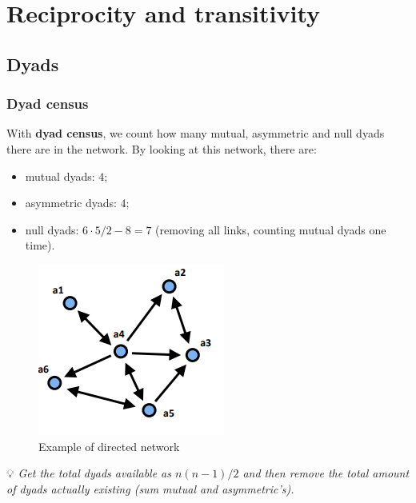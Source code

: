 \documentclass[
  notitlepage,
  onecolumn,
  openany]{book}
\providecommand{\tightlist}{%
  \setlength{\itemsep}{0pt}\setlength{\parskip}{0pt}}
\begin{document}
\hypertarget{reciprocity-and-transitivity}{%
\chapter{Reciprocity and transitivity}\label{reciprocity-and-transitivity}}

\hypertarget{dyads}{%
\section{Dyads}\label{dyads}}

\hypertarget{dyad-census}{%
\subsection{Dyad census}\label{dyad-census}}

With \textbf{dyad census}, we count how many mutual, asymmetric and null dyads there are in the network. By looking at this network, there are:

\begin{itemize}
\tightlist
\item
  mutual dyads: \(4\);
\item
  asymmetric dyads: \(4\);
\item
  null dyads: \(6\cdot 5/2 - 8 = 7\) (removing all links, counting mutual dyads one time).
\end{itemize}

\begin{figure}[h!]

{\centering \includegraphics[width=0.5\linewidth]{images/12-Reciprocity and transitivity/Untitled} 

}

\caption{Example of directed network}\label{fig:unnamed-chunk-96}
\end{figure}

💡 \emph{Get the total dyads available as \(n(n-1)/2\) and then remove the total amount of dyads actually existing (sum mutual and asymmetric's).}
\end{document}
